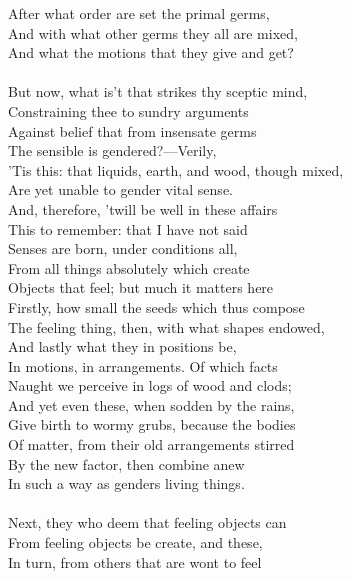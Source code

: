 After what order are set the primal germs,\\
And with what other germs they all are mixed,\\
And what the motions that they give and get?\\
\\
But now, what is't that strikes thy sceptic mind,\\
Constraining thee to sundry arguments\\
Against belief that from insensate germs\\
The sensible is gendered?—Verily,\\
'Tis this: that liquids, earth, and wood, though mixed,\\
Are yet unable to gender vital sense.\\
And, therefore, 'twill be well in these affairs\\
This to remember: that I have not said\\
Senses are born, under conditions all,\\
From all things absolutely which create\\
Objects that feel; but much it matters here\\
Firstly, how small the seeds which thus compose\\
The feeling thing, then, with what shapes endowed,\\
And lastly what they in positions be,\\
In motions, in arrangements. Of which facts\\
Naught we perceive in logs of wood and clods;\\
And yet even these, when sodden by the rains,\\
Give birth to wormy grubs, because the bodies\\
Of matter, from their old arrangements stirred\\
By the new factor, then combine anew\\
In such a way as genders living things.\\
\\
Next, they who deem that feeling objects can\\
From feeling objects be create, and these,\\
In turn, from others that are wont to feel

